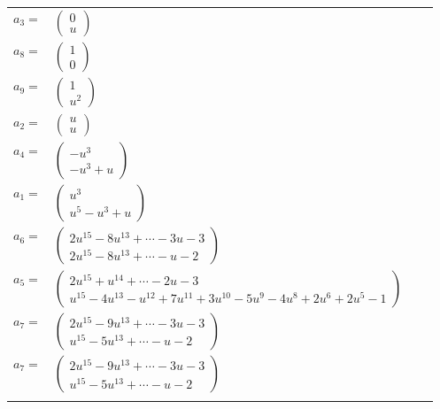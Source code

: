 \documentclass[1p]{elsarticle_modified}
\theoremstyle{definition}
\begin{document}
\begin{tabular}{m{7pt} m{180pt} m{7pt} m{180pt} }
\flushright $a_{3}=$&$\begin{pmatrix}0\\u\end{pmatrix}$ \\
\flushright $a_{8}=$&$\begin{pmatrix}1\\0\end{pmatrix}$ \\
\flushright $a_{9}=$&$\begin{pmatrix}1\\u^2\end{pmatrix}$ \\
\flushright $a_{2}=$&$\begin{pmatrix}u\\u\end{pmatrix}$ \\
\flushright $a_{4}=$&$\begin{pmatrix}- u^3\\- u^3+u\end{pmatrix}$ \\
\flushright $a_{1}=$&$\begin{pmatrix}u^3\\u^5- u^3+u\end{pmatrix}$ \\
\flushright $a_{6}=$&$\begin{pmatrix}2 u^{15}-8 u^{13}+\cdots-3 u-3\\2 u^{15}-8 u^{13}+\cdots- u-2\end{pmatrix}$ \\
\flushright $a_{5}=$&$\begin{pmatrix}2 u^{15}+u^{14}+\cdots-2 u-3\\u^{15}-4 u^{13}- u^{12}+7 u^{11}+3 u^{10}-5 u^9-4 u^8+2 u^6+2 u^5-1\end{pmatrix}$ \\
\flushright $a_{7}=$&$\begin{pmatrix}2 u^{15}-9 u^{13}+\cdots-3 u-3\\u^{15}-5 u^{13}+\cdots- u-2\end{pmatrix}$\\ \flushright $a_{7}=$&$\begin{pmatrix}2 u^{15}-9 u^{13}+\cdots-3 u-3\\u^{15}-5 u^{13}+\cdots- u-2\end{pmatrix}$\\&\end{tabular}
\end{document}
